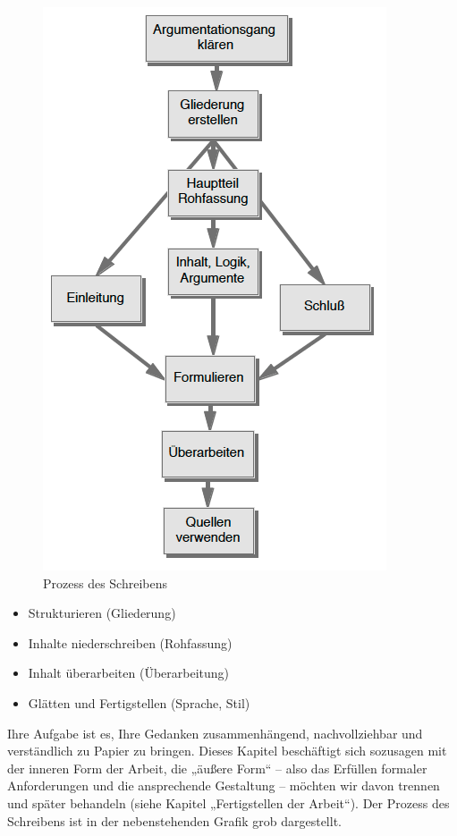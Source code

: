 \documentclass[]{book}
\providecommand{\tightlist}{%
  \setlength{\itemsep}{0pt}\setlength{\parskip}{0pt}}
\theoremstyle{definition}
\theoremstyle{definition}
\theoremstyle{definition}
\theoremstyle{remark}
\begin{document}
\begin{figure}

{\centering \includegraphics{images/schreiben-argumentationsgang-min} 

}

\caption{Prozess des Schreibens}\label{fig:unnamed-chunk-21}
\end{figure}

\begin{itemize}
\tightlist
\item
  Strukturieren (Gliederung)
\item
  Inhalte niederschreiben (Rohfassung)
\item
  Inhalt überarbeiten (Überarbeitung)
\item
  Glätten und Fertigstellen (Sprache, Stil)
\end{itemize}

Ihre Aufgabe ist es, Ihre Gedanken zusammenhängend, nachvollziehbar und
verständlich zu Papier zu bringen. Dieses Kapitel beschäftigt sich
sozusagen mit der inneren Form der Arbeit, die „äußere Form`` -- also
das Erfüllen formaler Anforderungen und die ansprechende Gestaltung --
möchten wir davon trennen und später behandeln (siehe Kapitel
„Fertigstellen der Arbeit``). Der Prozess des Schreibens ist in der
nebenstehenden Grafik grob dargestellt.
\end{document}
